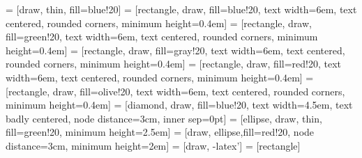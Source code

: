  = [draw, thin, fill=blue!20]
 = [rectangle, draw, fill=blue!20, text width=6em, text centered, rounded corners, minimum height=0.4em]
 = [rectangle, draw, fill=green!20, text width=6em, text centered, rounded corners, minimum height=0.4em]
 = [rectangle, draw, fill=gray!20, text width=6em, text centered, rounded corners, minimum height=0.4em]
 = [rectangle, draw, fill=red!20, text width=6em, text centered, rounded corners, minimum height=0.4em]
 = [rectangle, draw, fill=olive!20, text width=6em, text centered, rounded corners, minimum height=0.4em]
 = [diamond, draw, fill=blue!20, text width=4.5em, text badly centered, node distance=3cm, inner sep=0pt]
 = [ellipse, draw, thin, fill=green!20, minimum height=2.5em]
 = [draw, ellipse,fill=red!20, node distance=3cm, minimum height=2em]
 = [draw, -latex']
 = [rectangle]



